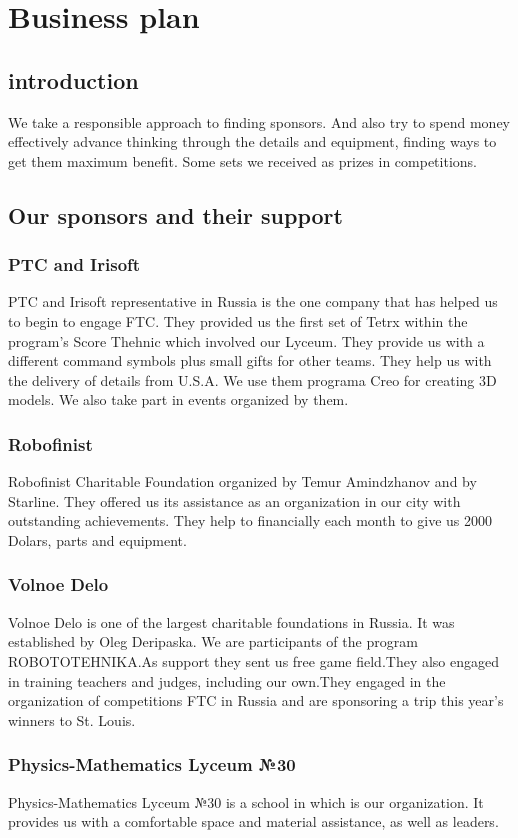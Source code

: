 \section{Business plan}
	\subsection{introduction}
	We take a responsible approach to finding sponsors. And also try to spend money effectively advance thinking through the details and equipment, finding ways to get them maximum benefit. Some sets we received as prizes in competitions.
	
	\subsection{Our sponsors and their support}
		\subsubsection{PTC and Irisoft}
		PTC and Irisoft representative in Russia is the one company that has helped us to begin to engage FTC. They provided us the first set of Tetrx within the program's Score Thehnic which involved our Lyceum. They provide us with a different command symbols plus small gifts for other teams. They help us with the delivery of details from U.S.A. We use them programa Creo for creating 3D models. We also take part in events organized by them.
		\subsubsection{Robofinist}	
		Robofinist Charitable Foundation organized by Temur Amindzhanov and by Starline. They offered us its assistance as an organization in our city with outstanding achievements. They help to financially each month to give us 2000 Dolars, parts and equipment.
		\subsubsection{Volnoe Delo}
		Volnoe Delo is one of the largest charitable foundations in Russia. It was established by Oleg Deripaska. We are participants of the program ROBOTOTEHNIKA.As support they sent us free game field.They also engaged in training teachers and judges, including our own.They engaged in the organization of competitions FTC in Russia and are sponsoring a trip this year's winners to St. Louis.	
		\subsubsection{Physics-Mathematics Lyceum №30}
		Physics-Mathematics Lyceum №30 is a school in which is our organization. It provides us with a comfortable space and material assistance, as well as leaders.
		
